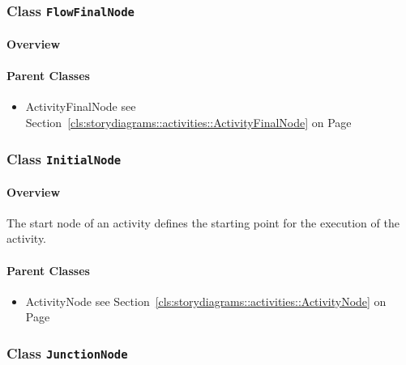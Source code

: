 \subsubsection{\Large{Class \bfseries \texttt{FlowFinalNode}\normalfont}}
\label{cls:storydiagrams::activities::FlowFinalNode} 
\paragraph{Overview}

	



\paragraph{Parent Classes}
\begin{itemize}
\item ActivityFinalNode see Section~\ref{cls:storydiagrams::activities::ActivityFinalNode} on Page~\pageref{cls:storydiagrams::activities::ActivityFinalNode}\end{itemize}
\subsubsection{\Large{Class \bfseries \texttt{InitialNode}\normalfont}}
\label{cls:storydiagrams::activities::InitialNode} 
\paragraph{Overview}

	
			
The start node of an activity defines the starting point for the execution of the activity.	
		
	



\paragraph{Parent Classes}
\begin{itemize}
\item ActivityNode see Section~\ref{cls:storydiagrams::activities::ActivityNode} on Page~\pageref{cls:storydiagrams::activities::ActivityNode}\end{itemize}
\subsubsection{\Large{Class \bfseries \texttt{JunctionNode}\normalfont}}
\label{cls:storydiagrams::activities::JunctionNode} 
